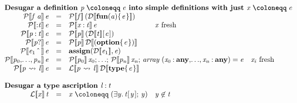 \documentclass[acmsmall,screen]{acmart}\settopmatter{}
\newcommand{\Varid}[1]{\mathit{#1}}
\newif\ifdesugarops
\newcommand{\De}[1]{{\mathcal D}\llbracket #1 \rrbracket}
\newcommand{\Ld}[2]{{\mathcal L}\llbracket #1 \rrbracket \, #2}
\newcommand{\Pd}[2]{{\mathcal P}\llbracket #1 \rrbracket \, #2}
\newcommand{\De}[1]{#1}
\newcommand{\Ld}[2]{#1 : #2}
\newcommand{\Pd}[2]{#1 := #2}
\newenvironment{figurebox}{\begin{figure}\begin{framed}}{\end{framed}\end{figure}}
\begin{document}
\begin{figurebox}
$$
\begin{array}{rclll}
\multicolumn{5}{l}{\textbf{Desugar a definition \ensuremath{\Varid{p}\mathrel{\coloneqq}\Varid{e}} into simple definitions with just \ensuremath{\Varid{x}\mathrel{\coloneqq}\Varid{e}}}} \\
\ifdesugarops
  \ensuremath{\Pd{ \Varid{x}}{ \Varid{e}}} & = & \ensuremath{\Varid{x}\mathrel{\coloneqq}\Varid{e}} \\
\fi
  \ensuremath{\Pd{ \Varid{f}\;\Varid{a}}{ \Varid{e}}} & = & \ensuremath{\Pd{ \Varid{f}}{ (\De{ \textbf{fun}(\Varid{a})\{\mskip1.5mu \Varid{e}\mskip1.5mu\}})}} \\
  \ensuremath{\Pd{ \mathbin{:}\Varid{t}}{ \Varid{e}}} & = & \ensuremath{\Pd{ \Varid{x}\mathbin{:}\Varid{t}}{ \Varid{e}}} & \text{\ensuremath{\Varid{x}} fresh} \\
  \ensuremath{\Pd{ \Varid{p}\mathbin{:}\Varid{t}}{ \Varid{e}}} & = & \ensuremath{\Pd{ \Varid{p}}{ (\De{ \Varid{t}} [\mskip1.5mu \Varid{e}\mskip1.5mu])}} \\
  \ensuremath{\Pd{ \Varid{p}\mathbin{?}}{ \Varid{e}}} & = & \ensuremath{\Pd{ \Varid{p}}{ \De{ (\textbf{option} \{\mskip1.5mu \Varid{e}\mskip1.5mu\})}}} \\
  \ensuremath{\Pd{ \Varid{e}_{\mathrm{1}} \hat{\hspace{0.8em}}}{ \Varid{e}}} & = & \ensuremath{\textbf{assign} (\De{ \Varid{e}_{\mathrm{1}}},\Varid{e})} \\
  \ensuremath{\Pd{ \Varid{p}_{\mathrm{0}},\!\ldots\!,\Varid{p}_{\Varid{n}}}{ \Varid{e}}} & = &
    \multicolumn{2}{l}{\ensuremath{\Pd{ \Varid{p}_{\mathrm{0}}}{ \Varid{x}_{\mathrm{0}}};\,\!\ldots\!;\,\Pd{ \Varid{p}_{\Varid{n}}}{ \Varid{x}_{\Varid{n}}};\,\Varid{array}\;(\Varid{x}_{\mathrm{0}}\mathbin{:}\textbf{any},\!\ldots\!,\Varid{x}_{\Varid{n}}\mathbin{:}\textbf{any})\mathrel{=}\Varid{e}}} & \text{\ensuremath{\Varid{x}_{\Varid{i}}} fresh} \\
  \ensuremath{\Pd{ \Varid{p}\;\!\leadsto\!\;\Varid{l}}{ \Varid{e}}} & = & \ensuremath{\Ld{ \Varid{p}\;\!\leadsto\!\;\Varid{l}}{ \De{ \textbf{type} \{\mskip1.5mu \Varid{e}\mskip1.5mu\}}}} \\
  \\
\multicolumn{5}{l}{\textbf{Desugar a type ascription \ensuremath{\Varid{l}\mathbin{:}\Varid{t}}}} \\
  \ensuremath{\Ld{ \Varid{x}}{ \Varid{t}}} & = & \ensuremath{\Varid{x}\mathrel{\coloneqq}(\exists\Varid{y}.\,\Varid{t} [\mskip1.5mu \Varid{y}\mskip1.5mu];\,\Varid{y})} & \ensuremath{\Varid{y}} \not\in \ensuremath{\Varid{t}} \\

\end{array}$$
\end{figurebox}
\end{document}
